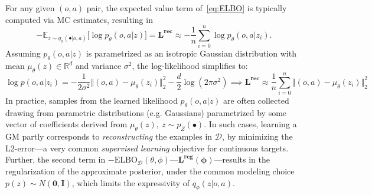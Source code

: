 For any given \((o,a) \) pair, the expected value term of~\ref{eq:ELBO} is typically computed via MC estimates, resulting in
\[ 
-\mathbb{E}_{z \sim q_\phi(\bullet \vert o,a)} \big[ \log p_\theta(o,a \vert z) \big] = \mathbf{L^{\text{rec}}} \approx - \frac{1}{n} \sum_{i=0}^n \log p_\theta(o,a \vert z_i).
\]
Assuming \( p_\theta(o,a \vert z) \) is parametrized as an isotropic Gaussian distribution with mean \(\mu_\theta (z) \in \mathbb R^d \) and variance \( \sigma^2 \), the log-likelihood simplifies to:
\[
\log p(o,a \vert z_i) = -\frac{1}{2\sigma^{2}} \big \Vert (o,a)-\mu_\theta(z_i) \big\Vert_2^2 -\frac{d}{2}\log(2\pi \sigma^{2}) \implies \mathbf{L^\text{rec}} \approx \frac {1}{n} \sum_{i=0}^n \big\Vert (o,a) - \mu_\theta(z_i) \big \Vert^2_2
\]
In practice, samples from the learned likelihood \( p_\theta(o,a \vert z) \) are often collected drawing from parametric distributions (e.g. Gaussians) parametrized by some vector of coefficients derived from \(\mu_\theta (z), \ z \sim p_Z (\bullet) \).
In such cases, learning a GM partly corresponds to \emph{reconstructing} the examples in \( \mathcal D \), by minimizing the L2-error---a very common \emph{supervised learning} objective for continuous targets.
Further, the second term in \( -\text{ELBO}_\mathcal D(\theta, \phi) \)---\( \mathbf{\mathbf{L^{\text{reg}}}(\phi)} \)---results in the regularization of the approximate posterior, under the common modeling choice \( p(z) \sim N(\mathbf{0}, \mathbf{I}) \), which limits the expressivity of \( q_\phi(z\vert o,a) \).

